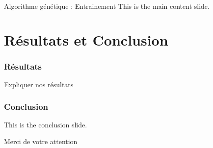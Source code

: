\documentclass{beamer}
\begin{document}
\begin{frame}{Algorithme génétique : Entrainement}
    This is the main content slide.
\end{frame}

\section{Résultats et Conclusion}
\begin{frame}
    \frametitle{Résultats}
    Expliquer nos résultats
\end{frame}

\begin{frame}
    \frametitle{Conclusion}
    This is the conclusion slide.
\end{frame}

\begin{frame}{}
    \begin{center}
        \Huge Merci de votre attention
    \end{center}
\end{frame}
\end{document}
